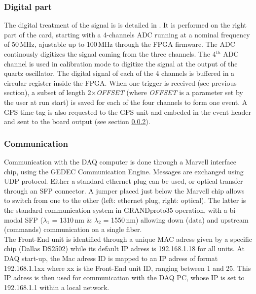 \subsubsection{Digital part}
\label{digital}
The digital treatment of the signal is is detailed in \cite{GP35daq}. It is performed on the right part of the card, starting with a 4-channels ADC \cite{ADCdoc} running at a nominal frequency of 50\,MHz, ajustable up to 100\,MHz through the FPGA firmware. The ADC continously digitizes the signal coming from the three channels. The 4$^{th}$ ADC channel is used in calibration mode to digitize the signal at the output of the quartz oscillator. The digital signal of each of the 4 channels is buffered in a circular register inside the FPGA. When one trigger is received (see previous section), a subset of length 2$\times${\it OFFSET} (where {\it OFFSET} is a parameter set by the user at run start) is saved for each of the four channels to form one event. A GPS time-tag is also requested to the GPS unit and embeded in the event header and sent to the board output (see section \ref{comms}).

\subsubsection{Communication}
\label{comms}
Communication with the DAQ computer is done through a Marvell interface chip, using the GEDEC Communication Engine. Messages are exchanged using UDP protocol. Either a standard ethernet plug can be used, or optical transfer through an SFP connector. A jumper placed just below the Marvell chip allows to switch from one to the other (left: ethernet plug, right: optical). The latter is the standard communication system in GRANDproto35 operation, with a bi-modal SFP ($\lambda_1$ = 1310\,nm \& $\lambda_2$ = 1550\,nm) allowing down (data) and upstream (commands) communication on a single fiber. \\
%
The Front-End unit is identified through a unique MAC adress given by a specific chip (Dallas DS2502) while its default IP adress is 192.168.1.18 for all units. At DAQ start-up, the Mac adress ID is mapped to an IP adress of format 192.168.1.1xx where xx is the Front-End unit ID, ranging between 1 and 25. This IP adress is then used for communication with the DAQ PC, whose IP is set to 192.168.1.1 within a local network.



